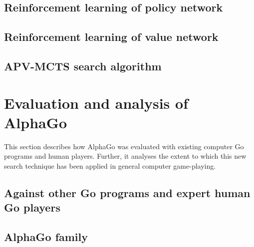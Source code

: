 \documentclass[conference]{IEEEtran}
\begin{document}
\subsection{Reinforcement learning of policy network} \label{RL_pn}



\subsection{Reinforcement learning of value network}


\subsection{APV-MCTS search algorithm}\label{MCTS}



\section{Evaluation and analysis of AlphaGo}
This section describes how AlphaGo was evaluated with existing computer Go programs and human players. Further, it analyses the extent to which this new search technique has been applied in general computer game-playing.

\subsection{Against other Go programs and expert human Go players}


\subsection{AlphaGo family}

 
\end{document}

